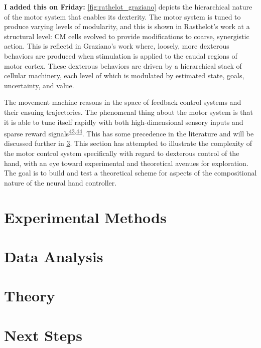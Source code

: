 \documentclass[
  a4paper,
]{article}
\begin{document}
\textbf{I added this on Friday:} \cref{fig:rathelot_graziano} depicts
the hierarchical nature of the motor system that enables its dexterity.
The motor system is tuned to produce varying levels of modularity, and
this is shown in Rasthelot's work at a structural level: CM cells
evolved to provide modifications to coarse, synergistic action. This is
reflectd in Graziano's work where, loosely, more dexterous behaviors are
produced when stimulation is applied to the caudal regions of motor
cortex. These dexterous behaviors are driven by a hierarchical stack of
cellular machinery, each level of which is modulated by estimated state,
goals, uncertainty, and value.

The movement machine reasons in the space of feedback control systems
and their ensuing trajectories. The phenomenal thing about the motor
system is that it is able to tune itself rapidly with both
high-dimensional sensory inputs and sparse reward
signals\textsuperscript{\protect\hyperlink{ref-bahlNeuralDynamicPoliciesfor2020}{43},\protect\hyperlink{ref-ijspeertDynamicalMovementPrimitives2013}{44}}.
This has some precedence in the literature and will be discussed further
in \cref{sec:theory}. This section has attempted to illustrate the
complexity of the motor control system specifically with regard to
dexterous control of the hand, with an eye toward experimental and
theoretical avenues for exploration. The goal is to build and test a
theoretical scheme for aspects of the compositional nature of the neural
hand controller.

\hypertarget{sec:experiment}{%
\section{Experimental Methods}\label{sec:experiment}}

\hypertarget{sec:data}{%
\section{Data Analysis}\label{sec:data}}

\hypertarget{sec:theory}{%
\section{Theory}\label{sec:theory}}

\hypertarget{sec:next_steps}{%
\section{Next Steps}\label{sec:next_steps}}
\end{document}
